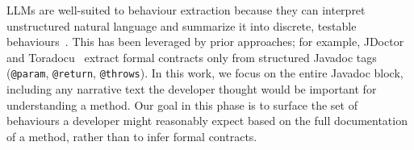 
LLMs are well-suited to behaviour extraction because they can interpret unstructured natural language and summarize it into discrete, testable behaviours~\cite{Wong_2023}.
This has been leveraged by prior approaches; for example,
JDoctor~\cite{10.1145/3213846.3213872} and Toradocu~\cite{10.1145/2931037.2931061} extract formal contracts only from structured Javadoc tags (\texttt{@param}, \texttt{@return}, \texttt{@throws}). 
In this work, we focus on the entire Javadoc block, including any narrative text the developer thought would be important for understanding a method.
Our goal in this phase is to surface the set of behaviours a developer might reasonably expect based on the full documentation of a method, rather than to infer formal contracts. 

